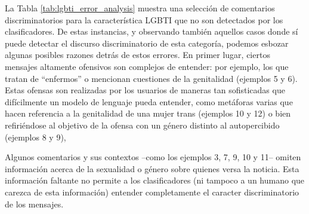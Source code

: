La Tabla \ref{tab:lgbti_error_analysis} muestra una selección de comentarios discriminatorios para la característica LGBTI que no son detectados por los clasificadores. De estas instancias, y observando también aquellos casos donde sí puede detectar el discurso discriminatorio de esta categoría, podemos esbozar algunas posibles razones detrás de estos errores. En primer lugar, ciertos mensajes altamente ofensivos son complejos de entender: por ejemplo, los que tratan de ``enfermos'' o mencionan cuestiones de la genitalidad (ejemplos 5 y 6). Estas ofensas son realizadas por los usuarios de maneras tan sofisticadas que difícilmente un modelo de lenguaje pueda entender, como metáforas varias que hacen referencia a la genitalidad de una mujer trans (ejemplos 10 y 12) o bien refiriéndose al objetivo de la ofensa con un género distinto al autopercibido (ejemplos 8 y 9),

Algunos comentarios y sus contextos --como los ejemplos 3, 7, 9, 10 y 11-- omiten información acerca de la sexualidad o género sobre quienes versa la noticia. Esta información faltante no permite a los clasificadores (ni tampoco a un humano que carezca de esta información) entender completamente el caracter discriminatorio de los mensajes.


